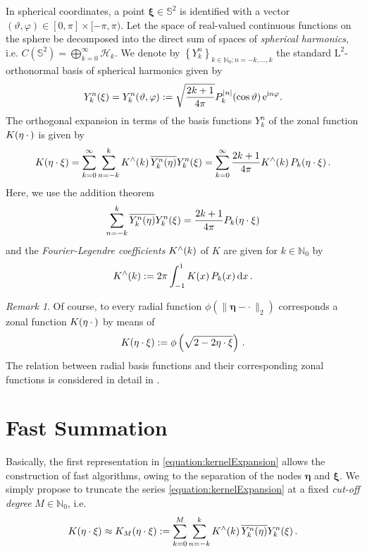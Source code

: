 \documentclass[11pt,a4paper,twoside,bibtotoc]{scrartcl}
\theoremstyle{plain}
\theoremstyle{definition}
\theoremstyle{remark}
\newtheorem{remark}[theorem]{Remark}
\newcommand{\NZ}{\ensuremath{\mathbb{N}_{0}}}
\newcommand{\fun}[2]{\ensuremath{#1{\hspace{-0.4ex}}\left(#2\right)}}
\newcommand{\dx}{\text{\rm{d}}}
\newcommand{\e}{\mbox{\rm{e}}}
\newcommand{\im}{\mbox{\scriptsize\rm{i}}}
\numberwithin{equation}{section}
\numberwithin{table}{section}
\numberwithin{figure}{section}
\begin{document}
In spherical coordinates, a point $\mathbf{\xi} \in \mathbb{S}^2$ is identified with 
a vector $(\vartheta,\varphi) \in [0,\pi] \times [-\pi,\pi)$. 
Let the space of real-valued continuous functions on the sphere be decomposed
into the direct sum of spaces of \emph{spherical harmonics}, i.e.
$C(\mathbb{S}^2)=\bigoplus_{k=0}^{\infty} \mathcal{H}_k$. We denote by 
$\left\{Y_{k}^n\right\}_{k \in \NZ; n=-k,\ldots,k}$ the 
standard $\text{L}^2$-orthonormal basis of spherical harmonics given by
\[
  \fun{Y_{k}^n}{\mathbf{\xi}} = \fun{Y_{k}^n}{\vartheta,\varphi} := 
  \sqrt{\frac{2k+1}{4\pi}} 
  \fun{P_{k}^{|n|}}{\cos\vartheta} \e^{\im n \varphi}.
\]
The orthogonal expansion in terms of the basis functions $Y_k^n$ 
of the zonal function $\fun{K}{\mathbf{\eta} \: \cdot \,}$ is given by
\begin{equation}
  \label{equation:kernelExpansion}
  \fun{K}{\mathbf{\eta} \cdot \mathbf{\xi}} = \sum_{k = 0}^{\infty} \sum_{n=-k}^k
  \fun{K^{\wedge}}{k}\overline{\fun{Y_{k}^n}{\mathbf{\eta}}} \fun{Y_{k}^n}{\mathbf{\xi}}
  = \sum_{k = 0}^{\infty} \frac{2k+1}{4\pi} \fun{K^{\wedge}}{k}
  \fun{P_{k}}{\mathbf{\eta} \cdot \mathbf{\xi}}.
\end{equation}
Here, we use the addition theorem
\[
\sum_{n=-k}^{k} \overline{\fun{Y_{k}^n}{\mathbf{\eta}}} \fun{Y_{k}^n}{\mathbf{\xi}} =
    \frac{2k+1}{4\pi}\fun{P_k}{\mathbf{\eta} \cdot \mathbf{\xi}}
\]
and the \emph{Fourier-Legendre coefficients} $\fun{K^{\wedge}}{k}$ of $K$ are given for $k \in \NZ$
by
\begin{equation}
  \label{equation:legtrafo}
  \fun{K^{\wedge}}{k} := 2 \pi \int_{-1}^{1} \fun{K}{x} \fun{P_{k}}{x} \dx 
  x\,.
\end{equation}

\begin{remark}
Of course, to every radial function $\phi(\|\mathbf{\eta} - \cdot \,\|_2)$ corresponds a zonal function 
$\fun{K}{\mathbf{\eta} \: \cdot \,}$ by means of 
\[
  \fun{K}{\mathbf{\eta} \cdot \mathbf{\xi}} := \phi\left(\sqrt{2-2\mathbf{\eta} \cdot
  \mathbf{\xi}}\right)\,.
\]
The relation between radial basis functions and their corresponding zonal
functions is considered in detail in \cite{CaFi}.
\end{remark}

\section{Fast Summation}
Basically, the first representation in \eqref{equation:kernelExpansion} allows
the construction of fast algorithms, owing to the separation of the
nodes $\mathbf{\eta}$ and $\mathbf{\xi}$.
We simply propose to truncate the series \eqref{equation:kernelExpansion} at a 
fixed \emph{cut-off degree} $M \in \NZ$, i.e.
\begin{equation}
  \label{Applications:TruncatedSeries}
  \fun{K}{\mathbf{\eta} \cdot \mathbf{\xi}} \approx \fun{K_{M}}{\mathbf{\eta} \cdot
  \mathbf{\xi}} := \sum_{k=0}^{M} \sum_{n=-k}^k \fun{K^{\wedge}}{k}
  \overline{\fun{Y_{k}^n}{\mathbf{\eta}}} \fun{Y_{k}^n}{\mathbf{\xi}}.
\end{equation}
\end{document}
